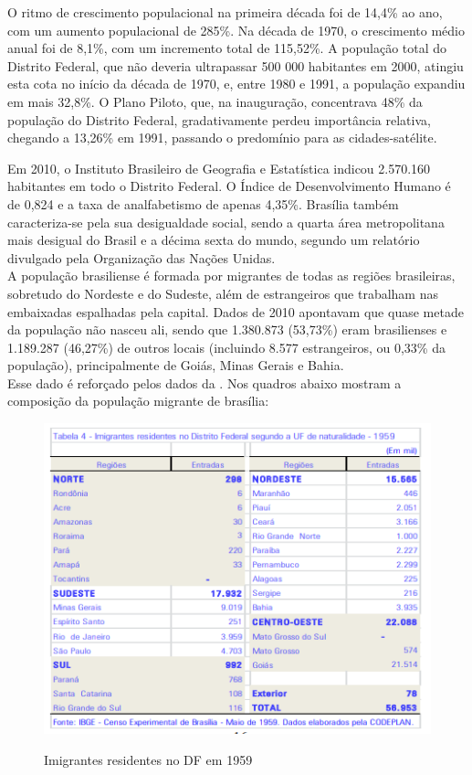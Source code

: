 O ritmo de crescimento populacional na primeira década foi de 14,4\% ao ano, com um aumento populacional de 285\%. Na década de 1970, o crescimento médio anual foi de 8,1\%, com um incremento total de 115,52\%. A população total do Distrito Federal, que não deveria ultrapassar 500 000 habitantes em 2000, atingiu esta cota no início da década de 1970, e, entre 1980 e 1991, a população expandiu em mais 32,8\%. O Plano Piloto, que, na inauguração, concentrava 48\% da população do Distrito Federal, gradativamente perdeu importância relativa, chegando a 13,26\% em 1991, passando o predomínio para as cidades-satélite.

Em 2010, o Instituto Brasileiro de Geografia e Estatística indicou 2.570.160 habitantes em todo o Distrito Federal. O Índice de Desenvolvimento Humano é de 0,824 e a taxa de analfabetismo de apenas 4,35\%. Brasília também caracteriza-se pela sua desigualdade social, sendo a quarta área metropolitana mais desigual do Brasil e a décima sexta do mundo, segundo um relatório divulgado pela Organização das Nações Unidas. \\

A população brasiliense é formada por migrantes de todas as regiões brasileiras, sobretudo do Nordeste e do Sudeste, além de estrangeiros que trabalham nas embaixadas espalhadas pela capital. Dados de 2010 apontavam que quase metade da população não nasceu ali, sendo que 1.380.873 (53,73\%) eram brasilienses e 1.189.287 (46,27\%) de outros locais (incluindo 8.577 estrangeiros, ou 0,33\% da população), principalmente de Goiás, Minas Gerais e Bahia.\\

Esse dado é reforçado pelos dados da . Nos quadros abaixo mostram a composição da população migrante de brasília:


\begin{figure}
    \centering
    \includegraphics{fig/imigrantes-1959}
    \label{fig:imigrantes-1959}
    \caption{Imigrantes residentes no DF em 1959}
\end{figure}

